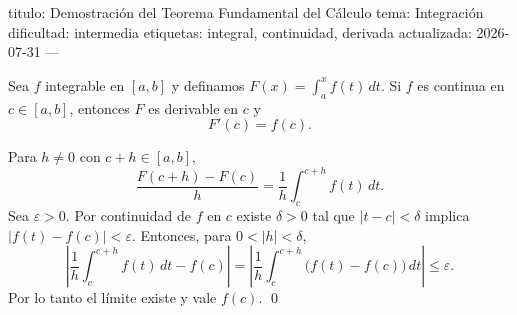 titulo: Demostración del Teorema Fundamental del Cálculo
tema: Integración
dificultad: intermedia
etiquetas: integral, continuidad, derivada
actualizada: 2026-07-31
---
\begin{teorema}
Sea $f$ integrable en $[a,b]$ y definamos $F(x)=\int_a^x f(t)\,dt$.
Si $f$ es continua en $c \in [a,b]$, entonces $F$ es derivable en $c$ y
\[
  F'(c) = f(c).
\]
\end{teorema}

\begin{demostracion}
Para $h \neq 0$ con $c+h \in [a,b]$,
\[
  \frac{F(c+h)-F(c)}{h} = \frac{1}{h}\int_c^{c+h} f(t)\,dt .
\]
Sea $\varepsilon > 0$. Por continuidad de $f$ en $c$ existe $\delta>0$ tal que
$|t-c|<\delta$ implica $|f(t)-f(c)|<\varepsilon$. Entonces, para $0<|h|<\delta$,
\[
  \left| \frac{1}{h}\int_c^{c+h} f(t)\,dt - f(c) \right|
  = \left| \frac{1}{h}\int_c^{c+h} \bigl(f(t)-f(c)\bigr)\,dt \right|
  \le \varepsilon .
\]
Por lo tanto el límite existe y vale $f(c)$. \qed
\end{demostracion}
